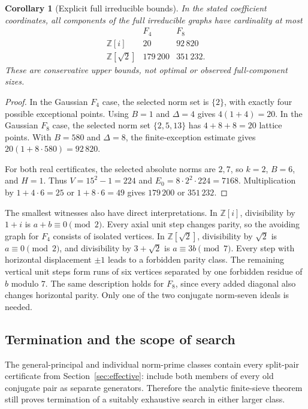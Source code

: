 \documentclass[11pt]{article}
\numberwithin{equation}{section}
\newtheorem{corollary}[theorem]{Corollary}
\theoremstyle{definition}\newtheorem{definition}[theorem]{Definition}
\theoremstyle{remark}\newtheorem{remark}[theorem]{Remark}
\newcommand{\Z}{\mathbb Z}\newcommand{\Q}{\mathbb Q}\newcommand{\R}{\mathbb R}
\begin{document}
\begin{corollary}[Explicit full irreducible bounds]\label{cor:fourbounds}
In the stated coefficient coordinates, all components of the full irreducible graphs have cardinality at most
\[
\begin{array}{c|rr}
 &F_4&F_8\\\hline
 \Z[i]&20&92\,820\\
 \Z[\sqrt2]&179\,200&351\,232.
\end{array}
\]
These are conservative upper bounds, not optimal or observed full-component sizes.
\end{corollary}
\begin{proof}
In the Gaussian $F_4$ case, the selected norm set is $\{2\}$, with exactly four possible exceptional points. Using $B=1$ and $\Delta=4$ gives $4(1+4)=20$. In the Gaussian $F_8$ case, the selected norm set $\{2,5,13\}$ has $4+8+8=20$ lattice points. With $B=580$ and $\Delta=8$, the finite-exception estimate gives $20(1+8\cdot580)=92\,820$.

For both real certificates, the selected absolute norms are $2,7$, so $k=2$, $B=6$, and $H=1$. Thus $V=15^2-1=224$ and $E_0=8\cdot2^2\cdot224=7168$. Multiplication by $1+4\cdot6=25$ or $1+8\cdot6=49$ gives $179\,200$ or $351\,232$.
\end{proof}

The smallest witnesses also have direct interpretations. In $\Z[i]$, divisibility by $1+i$ is $a+b\equiv0\pmod2$. Every axial unit step changes parity, so the avoiding graph for $F_4$ consists of isolated vertices. In $\Z[\sqrt2]$, divisibility by $\sqrt2$ is $a\equiv0\pmod2$, and divisibility by $3+\sqrt2$ is $a\equiv3b\pmod7$. Every step with horizontal displacement $\pm1$ leads to a forbidden parity class. The remaining vertical unit steps form runs of six vertices separated by one forbidden residue of $b$ modulo $7$. The same description holds for $F_8$, since every added diagonal also changes horizontal parity. Only one of the two conjugate norm-seven ideals is needed.

\subsection{Termination and the scope of search}

The general-principal and individual norm-prime classes contain every split-pair certificate from Section~\ref{sec:effective}: include both members of every old conjugate pair as separate generators. Therefore the analytic finite-sieve theorem still proves termination of a suitably exhaustive search in either larger class.
\end{document}
